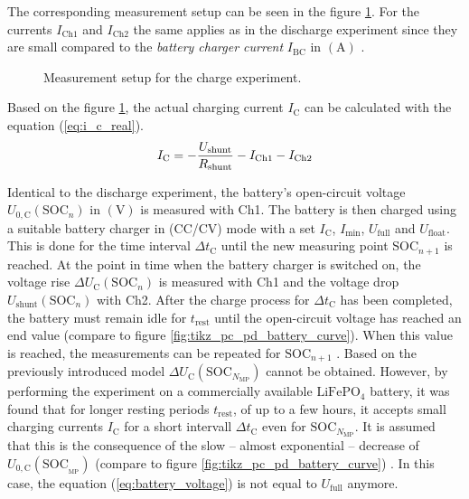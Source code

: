 The corresponding measurement setup can be seen in the figure \ref{fig:tikz_experiment_2}. For the currents $I_\mathrm{Ch1}$ and $I_\mathrm{Ch2}$ the same applies as in the discharge experiment since they are small compared to the \emph{battery charger current} $I_\mathrm{BC}$ in $\left(\mathrm{A}\right)$ \cite{Schrufer:2014}.
\begin{figure}[h!]
	\centering
	
	\caption{Measurement setup for the charge experiment.}
	\label{fig:tikz_experiment_2}
\end{figure}
Based on the figure \ref{fig:tikz_experiment_2}, the actual charging current $I_\mathrm{C}$ can be calculated with the equation (\ref{eq:i_c_real}).
\begin{equation}\label{eq:i_c_real}
	\centering
I_\mathrm{C} = -\dfrac{U_\mathrm{shunt}}{R_\mathrm{shunt}} - I_\mathrm{Ch1} - I_\mathrm{Ch2}
\end{equation}

Identical to the discharge experiment, the battery's open-circuit voltage $U_{0, \mathrm{C}}(\mathrm{SOC}_n)$ in $\left(\mathrm{V}\right)$ is measured with Ch1. The battery is then charged using a suitable battery charger in (CC/CV) mode with a set $I_{\mathrm C}$, $I_\mathrm{min}$, $U_\mathrm{full}$ and $U_\mathrm{float}$. This is done for the time interval $\Delta t_{\mathrm{C}}$ until the new measuring point $\mathrm{SOC}_{n+1}$ is reached. At the point in time when the battery charger is switched on, the voltage rise $\Delta U_{\mathrm C}(\mathrm{SOC}_n)$ is measured with Ch1 and the voltage drop $U_\mathrm{shunt}(\mathrm{SOC}_n)$ with Ch2. After the charge process for $\Delta t_{\mathrm{C}}$ has been completed, the battery must remain idle for $t_\mathrm{rest}$ until the open-circuit voltage has reached an end value (compare to figure \ref{fig:tikz_pc_pd_battery_curve}). When this value is reached, the measurements can be repeated for $\mathrm{SOC}_{n + 1}$ \cite{Rahmoun:2012, Hentunen:2014, Gurjer:2019}. Based on the previously introduced model $\Delta U_{\mathrm C}(\mathrm{SOC}_{N_\mathrm{MP}})$ cannot be obtained. However, by performing the experiment on a commercially available $\mathrm{LiFePO}_4$ battery, it was found that for longer resting periods $t_\mathrm{rest}$, of up to a few hours, it accepts small charging currents $I_{\mathrm C}$ for a short intervall $\Delta t_\mathrm{C}$ even for $\mathrm{SOC}_{N_\mathrm{MP}}$. It is assumed that this is the consequence of the slow -- almost exponential -- decrease of $U_{0, \mathrm{C}}(\mathrm{SOC}_{_\mathrm{MP}})$ (compare to figure \ref{fig:tikz_pc_pd_battery_curve}) \cite{Kurzweil:2018}. In this case, the equation (\ref{eq:battery_voltage}) is not equal to $U_{\mathrm{full}}$ anymore.

